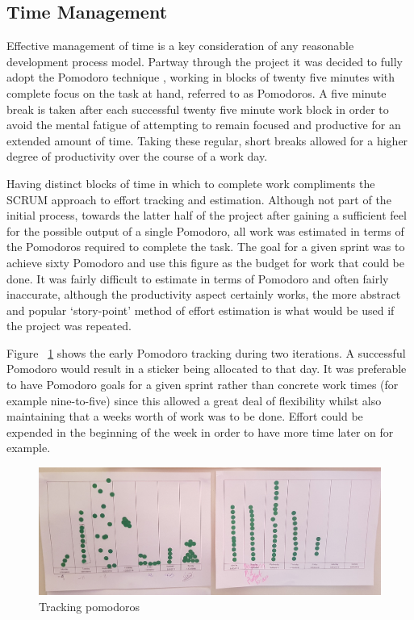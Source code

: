 \subsection{Time Management}
Effective management of time is a key consideration of any reasonable development process model. Partway through the project it was decided to fully adopt the Pomodoro technique \cite{pomodoro}, working in blocks of twenty five minutes with complete focus on the task at hand, referred to as Pomodoros. A five minute break is taken after each successful twenty five minute work block in order to avoid the mental fatigue of attempting to remain focused and productive for an extended amount of time. Taking these regular, short breaks allowed for a higher degree of productivity over the course of a work day.

Having distinct blocks of time in which to complete work compliments the SCRUM approach to effort tracking and estimation. Although not part of the initial process, towards the latter half of the project after gaining a sufficient feel for the possible output of a single Pomodoro, all work was estimated in terms of the Pomodoros required to complete the task. The goal for a given sprint was to achieve sixty Pomodoro and use this figure as the budget for work that could be done. It was fairly difficult to estimate in terms of Pomodoro and often fairly inaccurate, although the productivity aspect certainly works, the more abstract and popular `story-point' method of effort estimation is what would be used if the project was repeated.

Figure ~\ref{fig:pomo1} shows the early Pomodoro tracking during two iterations. A successful Pomodoro would result in a sticker being allocated to that day. It was preferable to have Pomodoro goals for a given sprint rather than concrete work times (for example nine-to-five) since this allowed a great deal of flexibility whilst also maintaining that a weeks worth of work was to be done. Effort could be expended in the beginning of the week in order to have more time later on for example.  

\begin{figure}[H]
    \centering
    \includegraphics[width=\textwidth]{images/process/pomotrack}
    \caption{Tracking pomodoros}
    \label{fig:pomo1}
\end{figure}



